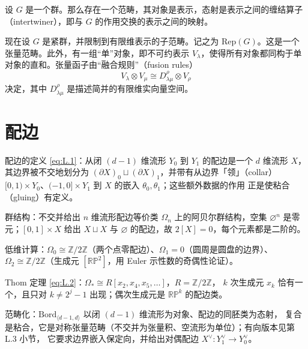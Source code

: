 设 $G$ 是一个群。那么存在一个范畴，其对象是表示，态射是表示之间的缠结算子（intertwiner），即与 $G$ 的作用交换的表示之间的映射。

现在设 $G$ 是紧群，并限制到有限维表示的子范畴。记之为 $\mathrm{Rep}(G)$。这是一个张量范畴。此外，有一组“单”对象，即不可约表示 $V_\lambda$，使得所有对象都同构于单对象的直和。张量函子由“融合规则”（fusion rules）
\begin{equation}
  V_\lambda\otimes V_\mu\cong D^\rho_{\lambda\mu}\otimes V_\rho
  \tag{K.52}
  \label{eq:K.52}
\end{equation}
决定，其中 $D^\rho_{\lambda\mu}$ 是描述简并的有限维实向量空间。


\section{配边} %

\begin{keytakeaways}
  \item 配边的定义 \eqref{eq:L.1}：从闭 $(d-1)$ 维流形 $Y_0$ 到 $Y_1$ 的配边是一个 $d$ 维流形 $X$，
    其边界被不交地划分为 $(\partial X)_0\sqcup(\partial X)_1$，并带有从边界「领」（collar）
    $[0,1)\times Y_0$、$(-1,0]\times Y_1$ 到 $X$ 的嵌入 $\theta_0,\theta_1$；这些额外数据的作用
    正是使粘合（gluing）有定义。
  \item 群结构：不交并给出 $n$ 维流形配边等价类 $\Omega_n$ 上的阿贝尔群结构，空集 $\varnothing^n$
    是零元；$[0,1]\times X$ 给出 $X\sqcup X$ 与 $\varnothing$ 的配边，故 $2[X]=0$，每个元素都是二阶的。
  \item 低维计算：$\Omega_0\cong\mathbb{Z}/2\mathbb{Z}$（两个点零配边）、$\Omega_1=0$（圆周是圆盘的边界）、
    $\Omega_2\cong\mathbb{Z}/2\mathbb{Z}$（生成元 $[\mathbb{RP}^2]$，用 Euler 示性数的奇偶性论证）。
  \item Thom 定理 \eqref{eq:L.2}：$\Omega_*\cong R[x_2,x_4,x_5,\dots]$，$R=\mathbb{Z}/2\mathbb{Z}$，
    $k$ 次生成元 $x_k$ 恰有一个，且只对 $k\ne 2^j-1$ 出现；偶次生成元是 $\mathbb{RP}^k$ 的配边类。
  \item 范畴化：$\mathrm{Bord}_{\langle d-1,d\rangle}$ 以闭 $(d-1)$ 维流形为对象、配边的同胚类为态射，
    复合是粘合，它是对称张量范畴（不交并为张量积、空流形为单位）；有向版本见第 L.3 小节，
    它要求边界嵌入保定向，并给出对偶配边 $X^\vee:Y_1^\vee\to Y_0^\vee$。
\end{keytakeaways}

